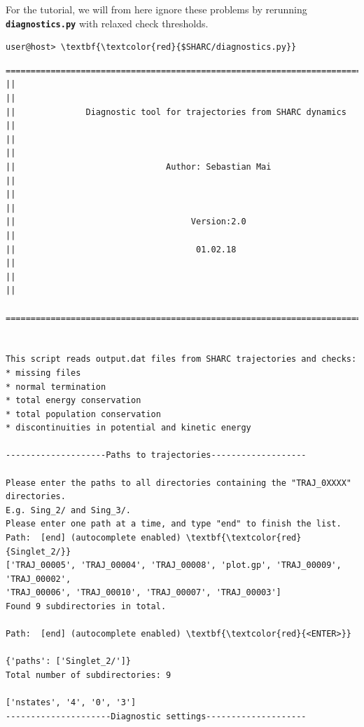 \documentclass[a4paper,11pt,DIV=15,openany]{scrbook}
\newcommand{\ttt}[1]{\textbf{\texttt{#1}}}
\begin{document}
For the tutorial, we will from here ignore these problems by rerunning \ttt{diagnostics.py} with relaxed check thresholds.

\begin{Verbatim}[commandchars=\\\{\}]
user@host> \textbf{\textcolor{red}{$SHARC/diagnostics.py}}
\end{Verbatim}


\begin{oframed}
\footnotesize\begin{Verbatim}[commandchars=\\\{\}]
  ================================================================================
||                                                                                ||
||              Diagnostic tool for trajectories from SHARC dynamics              ||
||                                                                                ||
||                              Author: Sebastian Mai                             ||
||                                                                                ||
||                                   Version:2.0                                  ||
||                                    01.02.18                                    ||
||                                                                                ||
  ================================================================================


This script reads output.dat files from SHARC trajectories and checks:
* missing files
* normal termination
* total energy conservation
* total population conservation
* discontinuities in potential and kinetic energy
  
--------------------Paths to trajectories-------------------

Please enter the paths to all directories containing the "TRAJ_0XXXX" directories.
E.g. Sing_2/ and Sing_3/. 
Please enter one path at a time, and type "end" to finish the list.
Path:  [end] (autocomplete enabled) \textbf{\textcolor{red}{Singlet_2/}}
['TRAJ_00005', 'TRAJ_00004', 'TRAJ_00008', 'plot.gp', 'TRAJ_00009', 'TRAJ_00002', 
'TRAJ_00006', 'TRAJ_00010', 'TRAJ_00007', 'TRAJ_00003']
Found 9 subdirectories in total.

Path:  [end] (autocomplete enabled) \textbf{\textcolor{red}{<ENTER>}}

{'paths': ['Singlet_2/']}
Total number of subdirectories: 9

['nstates', '4', '0', '3']
---------------------Diagnostic settings--------------------


\end{Verbatim}
\end{oframed}
\end{document}
